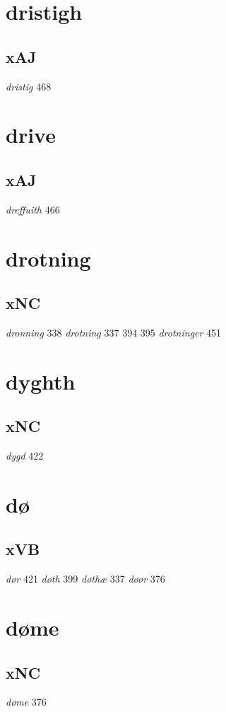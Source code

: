 \documentclass[a4paper,twocolumn]{article}
\begin{document}
\section{dristigh}
\label{sec:org583a8f3}
\subsection{xAJ}
\label{sec:orgf6559fc}
\emph{dristig} 468 
\section{drive}
\label{sec:org9a7abcf}
\subsection{xAJ}
\label{sec:orgdf24e65}
\emph{dreffuith} 466 
\section{drotning}
\label{sec:org1356ad4}
\subsection{xNC}
\label{sec:org1ee6fed}
\emph{dronning} 338 \emph{drotning} 337 394 395 \emph{drotninger} 451 
\section{dyghth}
\label{sec:org7e035e6}
\subsection{xNC}
\label{sec:org645f9f5}
\emph{dygd} 422 
\section{dø}
\label{sec:org7f98da0}
\subsection{xVB}
\label{sec:org2743a3f}
\emph{dør} 421 \emph{døth} 399 \emph{døthæ} 337 \emph{døør} 376 
\section{døme}
\label{sec:orgeff8481}
\subsection{xNC}
\label{sec:org24b33de}
\emph{døme} 376 
\end{document}
